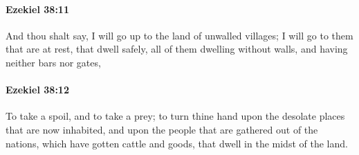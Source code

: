 		\paragraph{Ezekiel 38:11} %
			\label{EZEKIEL-38-11}

			And thou shalt say, I will go up to the land of unwalled villages; I will go to them that are at rest, that dwell safely, all of them dwelling without walls, and having neither bars nor gates,


		\paragraph{Ezekiel 38:12} %
			\label{EZEKIEL-38-12}

			To take a spoil, and to take a prey; to turn thine hand upon the desolate places that are now inhabited, and upon the people that are gathered out of the nations, which have gotten cattle and goods, that dwell in the midst of the land.

